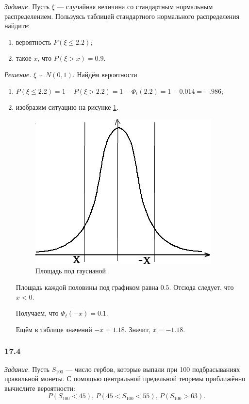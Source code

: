 \textit{Задание.} Пусть $ \xi $ --- случайная величина со стандартным нормальным распределением.
Пользуясь таблицей стандартного нормального распределения найдите:
\begin{enumerate}[label=\alph*)]
\item вероятность $P \left( \xi \leq 2.2 \right) $;
\item такое $x$, что $P \left( \xi > x \right) = 0.9$.
\end{enumerate}

\textit{Решение.} $ \xi \sim N \left( 0 ,1 \right) $.
Найдём вероятности
\begin{enumerate}[label=\alph*)]
\item $P \left( \xi \leq 2.2 \right) =
        1 -P \left( \xi > 2.2 \right) =
        1 - \Phi_t \left( 2.2 \right) =
        1 - 0.014 =
        -.986$;
\item изобразим ситуацию на рисунке \ref{fig:173}.

\begin{figure}[h!]
  \centering
  \includegraphics[width=.4\textwidth]{./pictures/17_3.png}
  \caption{Площадь под гаусианой}
  \label{fig:173}
\end{figure}

Площадь каждой половины под графиком равна $0.5$.
Отсюда следует, что $x < 0$.

Получаем, что $ \Phi_t \left( -x \right) = 0.1$.

Ещём в таблице значений $-x = 1.18$.
Значит, $x = -1.18$.
\end{enumerate}

\subsubsection*{17.4}

\textit{Задание.}
Пусть $S_{100}$ --- число гербов, которые выпали при 100 подбрасываниях правильной монеты.
С помощью центральной предельной теоремы приближённо вычислите вероятности:
$$P \left( S_{100} < 45 \right), \,
  P \left( 45 < S_{100} < 55 \right), \,
  P \left( S_{100} > 63 \right).$$

